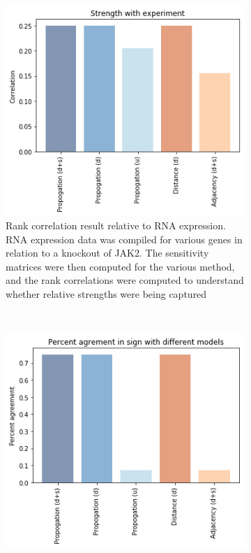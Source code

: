 \documentclass{article}
\begin{document}
\begin{figure}
    \centering
    \begin{subfigure}[b]{0.45\textwidth} 
        \includegraphics[width=\textwidth]{Images/Experiment_Jak2_correlation.png}
        \caption{Rank correlation result relative to RNA expression. RNA expression data was compiled for various genes in relation to a knockout of JAK2. The sensitivity matrices were then computed for the various method, and the rank correlations were computed to understand whether relative strengths were being captured}
        \label{fig:JAK2_strength}
    \end{subfigure}
    ~ %
    \begin{subfigure}[b]{0.45\textwidth}
        \includegraphics[width=\textwidth]{Images/Experiment_Jak2_sign.png}

\end{subfigure}
\end{figure}
\end{document}
